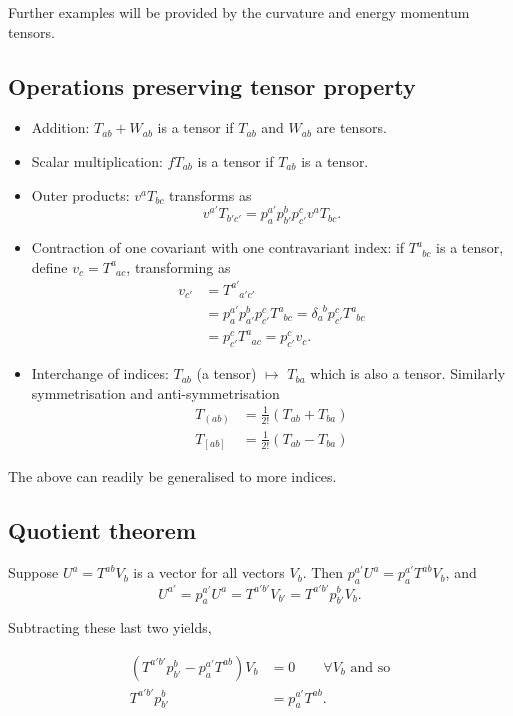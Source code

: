 \documentclass{notes}
\begin{document}
Further examples will be provided by the curvature and energy momentum
tensors.

\subsection{Operations preserving tensor property}

\begin{itemize}
\item Addition: $T_{ab}+W_{ab}$ is a tensor if $T_{ab}$
  and $W_{ab}$ are tensors.
\item Scalar multiplication: $fT_{ab}$ is a tensor if $T_{ab}$ is a tensor.
\item Outer products: $v^a T_{bc}$ transforms
as
\[
v^{a'} T_{b' c'} = p^{a'}_a p^b_{b'} p^c_{c'}
v^a T_{bc}.
\]
\item Contraction of one covariant with one contravariant index: if
  $T^a_{\phantom{a}bc}$ is a tensor, define
  $v_c=T^a_{\phantom{a}ac}$, transforming as
\begin{align*}
  v_{c'} &= T^{a'}_{\phantom{a'}a'c'} \\
  &= p^{a'}_a p^b_{a'} p^c_{c'}
  T^{a}_{\phantom{a} bc} = \delta^{\phantom{a}b}_a
  p^{c}_{c'}
  T^{a}_{\phantom{a}bc}\\
  &= p^{c}_{c'} T^a_{\phantom{a}ac}
  = p^{c}_{c'} v_c.
\end{align*}

\item Interchange of indices: $T_{ab}$ (a tensor) $\mapsto$ $T_{ba}$
which is also a tensor.  Similarly symmetrisation and anti-symmetrisation
\begin{align*}
T_{(ab)} &= \frac{1}{2!} (T_{ab}+T_{ba})\\
T_{[ab]} &= \frac{1}{2!} (T_{ab}-T_{ba})
\end{align*}
\end{itemize}

The above can readily be generalised to more indices.

\subsection{Quotient theorem}

Suppose $U^a=T^{ab}V_b$ is a vector for all vectors $V_b$.  Then
$p^{a'}_a U^a=p_a^{a'} T^{ab} V_b$, and 
\[
U^{a'}=p^{a'}_a U^a= T^{a'b'} V_{b'}=
T^{a'b'}p^b_{b'} V_b.
\]

Subtracting these last two yields,

\begin{align*}
  (T^{a'b'} p^b_{b'} - p^{a'}_a T^{ab})V_b
  &= 0 \qquad \forall V_b \text{ and so}\\
  T^{a'b'}p^b_{b'} &= p^{a'}_a T^{ab}.
\end{align*}
\end{document}
